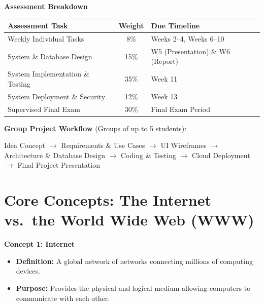 \documentclass[8pt, a4paper]{article}
\begin{document}
\begin{conceptbox}
\textbf{Assessment Breakdown}

\smallskip
\begin{tabularx}{\linewidth}{X c l}
  \toprule
  \textbf{Assessment Task} & \textbf{Weight} & \textbf{Due Timeline} \\
  \midrule
  Weekly Individual Tasks           & 8\%  & Weeks 2--4, Weeks 6--10 \\
  System \& Database Design         & 15\% & W5 (Presentation) \& W6 (Report) \\
  System Implementation \& Testing  & 35\% & Week 11 \\
  System Deployment \& Security     & 12\% & Week 13 \\
  Supervised Final Exam             & 30\% & Final Exam Period \\
  \bottomrule
\end{tabularx}
\end{conceptbox}

\medskip

\textbf{Group Project Workflow} (Groups of up to 5 students):

\smallskip\noindent
Idea Concept $\to$ Requirements \& Use Cases $\to$ UI Wireframes $\to$ Architecture \& Database Design $\to$ Coding \& Testing $\to$ Cloud Deployment $\to$ Final Project Presentation

\section{Core Concepts: The Internet vs.\ the World Wide Web (WWW)}

\begin{conceptbox}
\textbf{Concept 1: Internet}
\begin{itemize}
  \item \textbf{Definition:} A global network of networks connecting millions of computing devices.
  \item \textbf{Purpose:} Provides the physical and logical medium allowing computers to communicate with each other.
\end{itemize}
\end{conceptbox}
\end{document}
